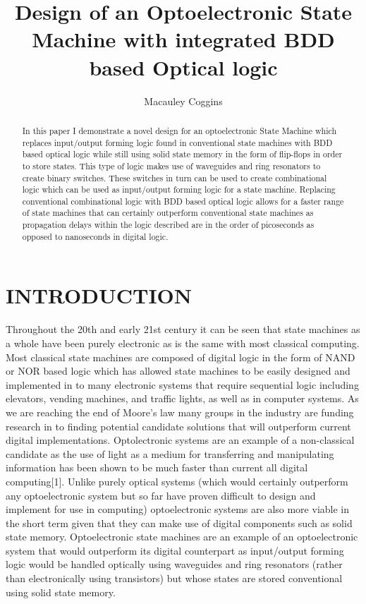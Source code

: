 \documentclass[letterpaper, 10 pt, conference]{ieeeconf}  %
\title{\LARGE \bf
Design of an Optoelectronic State Machine with integrated BDD based Optical logic
}
\author{Macauley Coggins
}
\begin{document}
\maketitle
\thispagestyle{empty}
\pagestyle{empty}


\begin{abstract}

In this paper I demonstrate a novel design for an optoelectronic State Machine which replaces input/output forming logic found in conventional state machines with BDD based optical logic while still using solid state memory in the form of flip-flops in order to store states. This type of logic makes use of waveguides and ring resonators to create binary switches. These switches in turn can be used to create combinational logic which can be used as input/output forming logic for a state machine. Replacing conventional combinational logic with BDD based optical logic allows for a faster range of state machines that can certainly outperform conventional state machines as propagation delays within the logic described are in the order of picoseconds as opposed to nanoseconds in digital logic.    

\end{abstract}
\section{INTRODUCTION}

Throughout the 20th and early 21st century it can be seen that state machines as a whole have been purely electronic as is the same with most classical  computing. Most classical state machines are composed of digital logic in the form of NAND or NOR based logic which has allowed state machines to be easily designed and implemented in to many electronic systems that require sequential logic including elevators, vending machines, and traffic lights, as well as in computer systems. As we are reaching the end of Moore's law many groups in the industry are funding research in to finding potential candidate solutions that will outperform current digital implementations. Optolectronic systems are an example of a non-classical candidate as the use of light as a medium for transferring and manipulating information has been shown to be much faster than current all digital computing[1]. Unlike purely optical systems (which would certainly outperform any optoelectronic system but so far have proven difficult to design and implement for use in computing) optoelectronic systems are also more viable in the short term given that they can make use of digital components such as solid state memory. Optoelectronic state machines are an example of an optoelectronic system that would outperform its digital counterpart as input/output forming logic would be handled optically using waveguides and ring resonators (rather than electronically using transistors) but whose states are stored conventional using solid state memory. 
\end{document}

